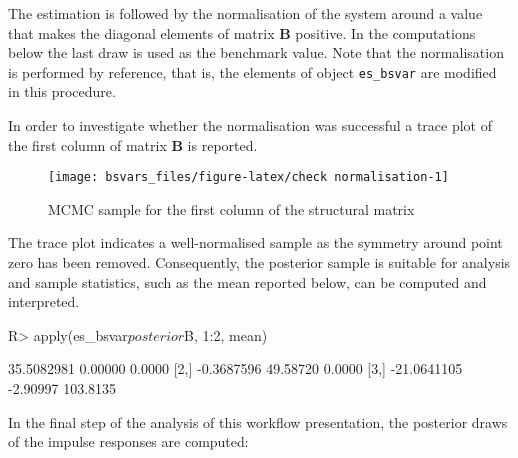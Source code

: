 \documentclass[
  nojss]{jss}
\begin{document}
The estimation is followed by the normalisation of the system around a
value that makes the diagonal elements of matrix \(\mathbf{B}\)
positive. In the computations below the last draw is used as the
benchmark value. Note that the normalisation is performed by reference,
that is, the elements of object \texttt{es\_bsvar} are modified in this
procedure.

\begin{CodeChunk}
\end{CodeChunk}

In order to investigate whether the normalisation was successful a trace
plot of the first column of matrix \(\mathbf{B}\) is reported.

\begin{CodeChunk}
\begin{figure}

{\centering \texttt{[image: bsvars\_files/figure-latex/check normalisation-1]} 

}

\caption[MCMC sample for the first column of the structural matrix]{MCMC sample for the first column of the structural matrix}\label{fig:check normalisation}
\end{figure}
\end{CodeChunk}

The trace plot indicates a well-normalised sample as the symmetry around
point zero has been removed. Consequently, the posterior sample is
suitable for analysis and sample statistics, such as the mean reported
below, can be computed and interpreted.

\begin{CodeChunk}
\begin{CodeInput}
R> apply(es_bsvar$posterior$B, 1:2, mean)
\end{CodeInput}
\begin{CodeOutput}
            [,1]     [,2]     [,3]
[1,]  35.5082981  0.00000   0.0000
[2,]  -0.3687596 49.58720   0.0000
[3,] -21.0641105 -2.90997 103.8135
\end{CodeOutput}
\end{CodeChunk}

In the final step of the analysis of this workflow presentation, the
posterior draws of the impulse responses are computed:
\end{document}
